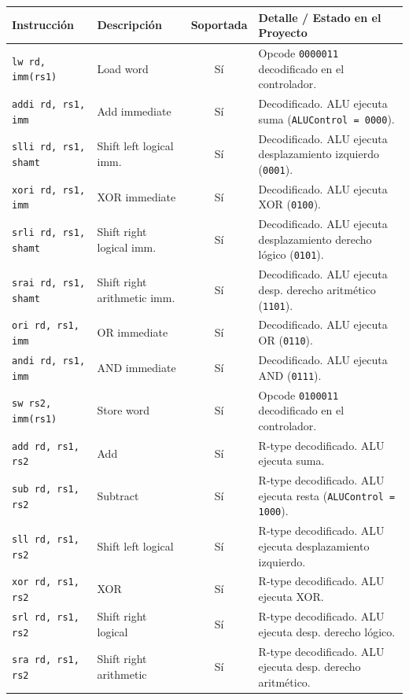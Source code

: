\documentclass[12pt, a4paper]{article}
\begin{document}
\begin{table}[H]
\centering
\footnotesize
\setlength{\tabcolsep}{4pt}
\begin{tabular}{>{\raggedright\arraybackslash}p{3.3cm} >{\raggedright\arraybackslash}p{3.0cm} c >{\raggedright\arraybackslash}p{6.4cm}}
\toprule
\textbf{Instrucción} & \textbf{Descripción} & \textbf{Soportada} & \textbf{Detalle / Estado en el Proyecto} \\


\midrule
\texttt{lw rd, imm(rs1)} & Load word & Sí & Opcode \texttt{0000011} decodificado en el controlador. \\
\texttt{addi rd, rs1, imm} & Add immediate & Sí & Decodificado. ALU ejecuta suma (\texttt{ALUControl = 0000}). \\
\texttt{slli rd, rs1, shamt} & Shift left logical imm. & Sí & Decodificado. ALU ejecuta desplazamiento izquierdo (\texttt{0001}). \\
\texttt{xori rd, rs1, imm} & XOR immediate & Sí & Decodificado. ALU ejecuta XOR (\texttt{0100}). \\
\texttt{srli rd, rs1, shamt} & Shift right logical imm. & Sí & Decodificado. ALU ejecuta desplazamiento derecho lógico (\texttt{0101}). \\
\texttt{srai rd, rs1, shamt} & Shift right arithmetic imm. & Sí & Decodificado. ALU ejecuta desp. derecho aritmético (\texttt{1101}). \\
\texttt{ori rd, rs1, imm} & OR immediate & Sí & Decodificado. ALU ejecuta OR (\texttt{0110}). \\
\texttt{andi rd, rs1, imm} & AND immediate & Sí & Decodificado. ALU ejecuta AND (\texttt{0111}). \\
\texttt{sw rs2, imm(rs1)} & Store word & Sí & Opcode \texttt{0100011} decodificado en el controlador. \\
\texttt{add rd, rs1, rs2} & Add & Sí & R-type decodificado. ALU ejecuta suma. \\
\texttt{sub rd, rs1, rs2} & Subtract & Sí & R-type decodificado. ALU ejecuta resta (\texttt{ALUControl = 1000}). \\
\texttt{sll rd, rs1, rs2} & Shift left logical & Sí & R-type decodificado. ALU ejecuta desplazamiento izquierdo. \\
\texttt{xor rd, rs1, rs2} & XOR & Sí & R-type decodificado. ALU ejecuta XOR. \\
\texttt{srl rd, rs1, rs2} & Shift right logical & Sí & R-type decodificado. ALU ejecuta desp. derecho lógico. \\
\texttt{sra rd, rs1, rs2} & Shift right arithmetic & Sí & R-type decodificado. ALU ejecuta desp. derecho aritmético. \\

\end{tabular}
\end{table}
\end{document}
